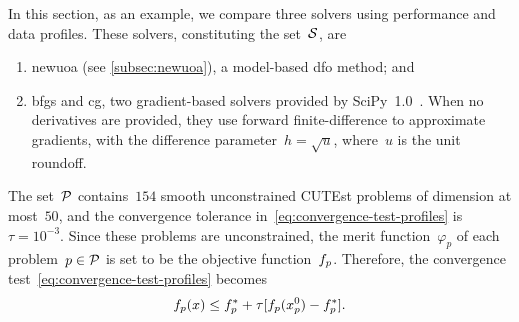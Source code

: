 In this section, as an example, we compare three solvers using performance and data profiles.
These solvers, constituting the set~$\mathcal{S}$, are
\begin{enumerate}
    \item \gls{newuoa} (see \cref{subsec:newuoa}), a model-based \gls{dfo} method; and
    \item \gls{bfgs} and \gls{cg}, two gradient-based solvers provided by SciPy~1.0~\cite{Virtanen_Etal_2020}.
    When no derivatives are provided, they use forward finite-difference to approximate gradients, with the difference parameter~$h = \sqrt{u}$, where~$u$ is the unit roundoff.
\end{enumerate}
The set~$\mathcal{P}$ contains~$154$ smooth unconstrained CUTEst problems of dimension at most~$50$, and the convergence tolerance in~\cref{eq:convergence-test-profiles} is~$\tau = 10^{-3}$.
Since these problems are unconstrained, the merit function~$\varphi_p$ of each problem~$p \in \mathcal{P}$ is set to be the objective function~$f_p$.
Therefore, the convergence test~\cref{eq:convergence-test-profiles} becomes
\begin{equation}
    \label{eq:convergence-test-profiles-unconstrained}
    \obj_p(\iter) \le \obj_p^{\ast} + \tau [\obj_p(\iter_p^0) - \obj_p^{\ast}].
\end{equation}


